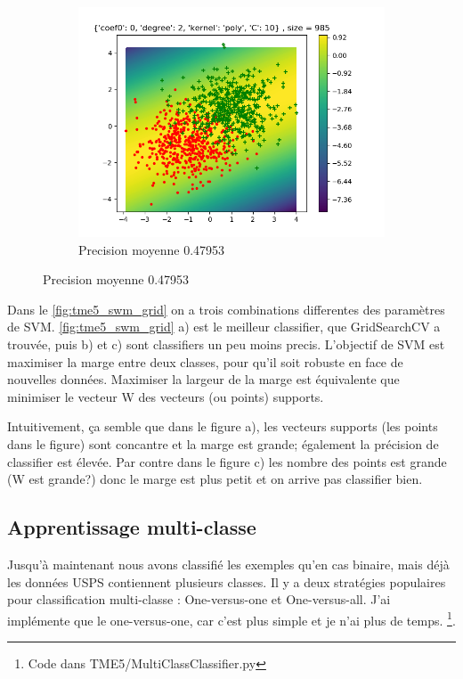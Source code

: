 \documentclass[a4paper,12pt]{article}
\begin{document}
\begin{figure}[h!]
\begin{subfigure}{.33\textwidth}
  \centering
	\includegraphics[width=\linewidth]{images/tme5/grid_arti3.png}
	\caption{Precision moyenne 0.47953}
\end{subfigure}
\end{figure}

Dans le \autoref{fig:tme5_swm_grid} on a trois combinations differentes des paramètres de SVM. \autoref{fig:tme5_swm_grid} a)
est le meilleur classifier, que GridSearchCV a trouvée, puis b) et c) sont classifiers un peu moins precis.
L'objectif de SVM est maximiser la marge entre deux classes, pour qu'il soit robuste en face de nouvelles données.
Maximiser la largeur de la marge est équivalente que minimiser le vecteur W des vecteurs (ou points) supports.

Intuitivement, ça semble que dans le figure a), les vecteurs supports (les points dans le figure) sont concantre et la marge est grande; également la précision de classifier est élevée.
Par contre dans le figure c) les nombre des points est grande (W est grande?) donc le marge est plus petit et on arrive pas
classifier bien.

\subsection{Apprentissage multi-classe}

Jusqu'à maintenant nous avons classifié les exemples qu'en cas binaire, mais déjà les données USPS contiennent plusieurs classes.
Il y a deux stratégies populaires pour classification multi-classe : One-versus-one et One-versus-all.
J'ai implémente que le one-versus-one, car c'est plus simple et je n'ai plus de temps. \footnote{Code dans TME5\slash MultiClassClassifier.py}.
\end{document}

